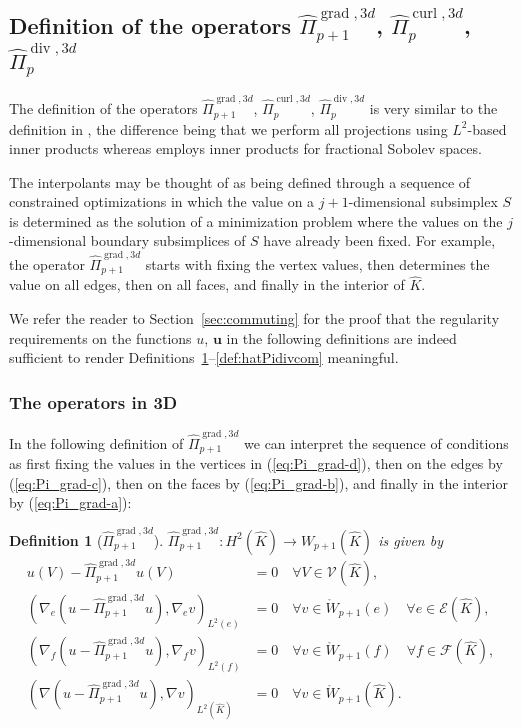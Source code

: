 \documentclass{article}
\newtheorem{definition}[theorem]{Definition}
\newcommand{\hatPicurlcom}{\widehat \Pi^{\operatorname*{curl},3d}_p}
\newcommand{\hatPigradcom}{\widehat\Pi^{\operatorname*{grad},3d}_{p+1}}
\newcommand{\hatPidivcom}{\widehat\Pi^{\operatorname*{div},3d}_{p}}
\begin{document}
\subsection{Definition of the operators $\hatPigradcom$, $\hatPicurlcom$, $\hatPidivcom$}
\label{sec:def-operators}
The definition of the operators $\hatPigradcom$, $\hatPicurlcom$, $\hatPidivcom$ is very similar
to the definition in \cite{demkowicz-buffa05,demkowicz08}, the difference being that we 
perform all projections using $L^2$-based inner products whereas \cite{demkowicz-buffa05,demkowicz08} 
employs inner products for fractional Sobolev spaces. 

The interpolants may be thought of as being defined 
through a sequence of constrained optimizations in which the value on a 
$j+1$-dimensional subsimplex $S$ 
is determined as the  solution of a minimization problem where the values on the $j$-dimensional boundary 
subsimplices of $S$ have already been fixed. For example, the operator $\hatPigradcom$ starts with
fixing the vertex values, then determines the value on all edges, then on all faces, and finally in the 
interior of $\widehat K$. 

We refer the reader to Section~\ref{sec:commuting} for the proof that
the regularity requirements on the functions $u$, ${\mathbf u}$ 
in the following definitions are indeed sufficient to render 
Definitions~\ref{def:hatPigradcom}--\ref{def:hatPidivcom} meaningful.
\subsubsection{The operators in 3D}
\label{sec:3d-operators}
In the following definition of $\hatPigradcom$ we can interpret the sequence of conditions 
as first fixing the values in the vertices in (\ref{eq:Pi_grad-d}), 
then on the edges by (\ref{eq:Pi_grad-c}), 
then on the faces by (\ref{eq:Pi_grad-b}), 
and finally in the interior by (\ref{eq:Pi_grad-a}):
\begin{definition}[$\hatPigradcom$]
\label{def:hatPigradcom}
$\hatPigradcom%
:H^{2}(\widehat{K})\rightarrow W_{p+1}(\widehat{K})$ is given by
\begin{subequations}
\label{eq:Pi_grad}
\begin{align}
u(V)-\hatPigradcom u(V)  &  =0\quad \forall
V\in{\mathcal{V}}(\widehat{K}), 
\label{eq:Pi_grad-d}\\
(\nabla_{e}(u-\hatPigradcom u),\nabla
_{e}v)_{L^{2}(e)}  &  =0\quad\forall v\in\mathring{W}_{p+1}(e)\quad\forall
e\in{\mathcal{E}}(\widehat{K}),
\label{eq:Pi_grad-c}\\
(\nabla_{f}(u-\hatPigradcom u),\nabla
_{f}v)_{L^{2}(f)}  &  =0\quad\forall v\in\mathring{W}_{p+1}(f)\quad\forall
f\in{\mathcal{F}}(\widehat{K}),
\label{eq:Pi_grad-b}\\
(\nabla(u-\hatPigradcom u),\nabla v)_{L^{2}%
(\widehat{K})}  &  =0\quad\forall v\in\mathring{W}_{p+1}(\widehat{K}).
\label{eq:Pi_grad-a}
\end{align}
\end{subequations}
\end{definition}
\end{document}

